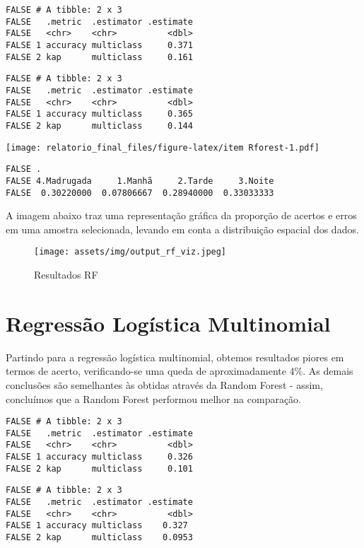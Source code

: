 \documentclass[
  12pt,
  portuguese,
]{report}
\begin{document}
\begin{verbatim}
FALSE # A tibble: 2 x 3
FALSE   .metric  .estimator .estimate
FALSE   <chr>    <chr>          <dbl>
FALSE 1 accuracy multiclass     0.371
FALSE 2 kap      multiclass     0.161
\end{verbatim}

\begin{verbatim}
FALSE # A tibble: 2 x 3
FALSE   .metric  .estimator .estimate
FALSE   <chr>    <chr>          <dbl>
FALSE 1 accuracy multiclass     0.365
FALSE 2 kap      multiclass     0.144
\end{verbatim}

\texttt{[image: relatorio\_final\_files/figure-latex/item Rforest-1.pdf]}

\begin{verbatim}
FALSE .
FALSE 4.Madrugada     1.Manhã     2.Tarde     3.Noite 
FALSE  0.30220000  0.07806667  0.28940000  0.33033333
\end{verbatim}

A imagem abaixo traz uma representação gráfica da proporção de acertos e erros em uma amostra selecionada, levando em conta a distribuição espacial dos dados.

\begin{figure}
\centering
\texttt{[image: assets/img/output\_rf\_viz.jpeg]}
\caption{Resultados RF}
\end{figure}

\hypertarget{regressuxe3o-loguxedstica-multinomial}{%
\section{Regressão Logística Multinomial}\label{regressuxe3o-loguxedstica-multinomial}}

Partindo para a regressão logística multinomial, obtemos resultados piores em termos de acerto, verificando-se uma queda de aproximadamente 4\%. As demais conclusões são semelhantes às obtidas através da Random Forest - assim, concluímos que a Random Forest performou melhor na comparação.

\begin{verbatim}
FALSE # A tibble: 2 x 3
FALSE   .metric  .estimator .estimate
FALSE   <chr>    <chr>          <dbl>
FALSE 1 accuracy multiclass     0.326
FALSE 2 kap      multiclass     0.101
\end{verbatim}

\begin{verbatim}
FALSE # A tibble: 2 x 3
FALSE   .metric  .estimator .estimate
FALSE   <chr>    <chr>          <dbl>
FALSE 1 accuracy multiclass    0.327 
FALSE 2 kap      multiclass    0.0953
\end{verbatim}
\end{document}

